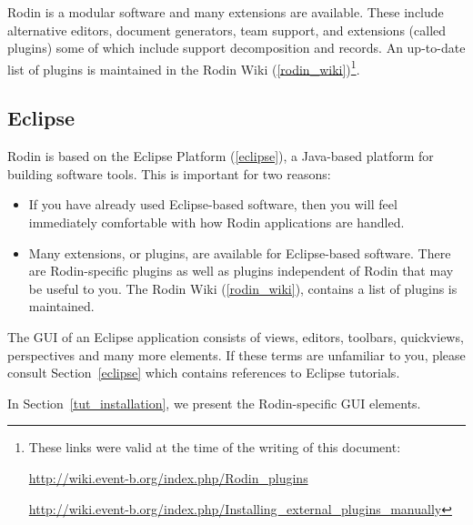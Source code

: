 Rodin is a modular software and many extensions are available.  These include alternative editors, document generators, team support, and extensions (called plugins) some of which include support decomposition and records.  An up-to-date list of plugins is maintained in the Rodin Wiki (\ref{rodin_wiki})\footnote{These links were valid at the time of the writing of this document:

\url{http://wiki.event-b.org/index.php/Rodin_plugins}

\url{http://wiki.event-b.org/index.php/Installing_external_plugins_manually}}.

\subsection{Eclipse} 
\label{tut_eclipse}

Rodin is based on the Eclipse Platform (\ref{eclipse}), a Java-based platform for building software tools.  This is important for two reasons:
\begin{itemize}
	\item If you have already used Eclipse-based software, then you will feel immediately comfortable with how Rodin applications are handled.
	\item Many extensions, or plugins, are available for Eclipse-based software. There are Rodin-specific plugins as well as plugins independent of Rodin that may be useful to you.  The Rodin Wiki (\ref{rodin_wiki}), contains a list of plugins is maintained.
\end{itemize}

The GUI of an Eclipse application consists of views, editors, toolbars, quickviews, perspectives and many more elements.  If these terms are unfamiliar to you, please consult Section~\ref{eclipse} which contains references to Eclipse tutorials.

In Section~\ref{tut_installation}, we present the Rodin-specific GUI elements.


